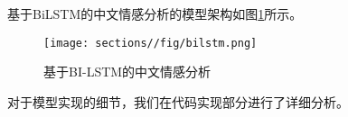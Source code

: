 \vspace{8pt}

基于BiLSTM的中文情感分析的模型架构如图\ref{fig:bilstm}所示。

\vspace{8pt}

\begin{figure}[H]
    \centering
    \texttt{[image: sections//fig/bilstm.png]}
    \caption{基于BI-LSTM的中文情感分析}
    \label{fig:bilstm}
\end{figure}

对于模型实现的细节，我们在代码实现部分进行了详细分析。